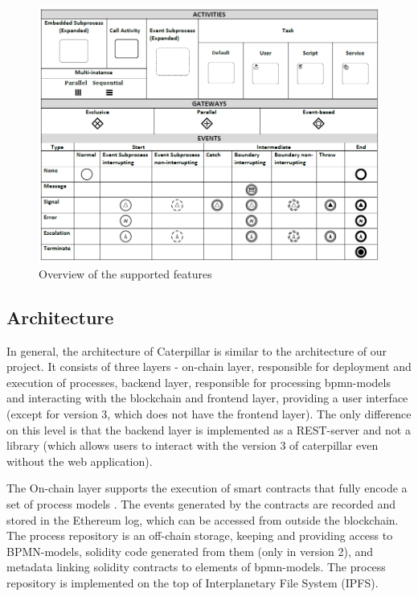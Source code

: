 \begin{figure}[hbt]
	\includegraphics[width=\textwidth]{gfx/caterpillar-bpmn}
	\caption{Overview of the supported features}
	\label{fig:caterpillar:overview:bpmn}
\end{figure}

\subsection{Architecture}
\label{sec:caterpillar:overview:architecture}

In general, the architecture of Caterpillar is similar to the architecture of our project. It consists of three layers - on-chain layer, responsible for deployment and execution of processes, backend layer, responsible for processing bpmn-models and interacting with the blockchain and frontend layer, providing a user interface (except for version 3, which does not have the frontend layer). The only difference on this level is that the backend layer is implemented as a REST-server and not a library (which allows users to interact with the version 3 of caterpillar even without the web application).

The On-chain layer supports the execution of smart contracts that fully encode a set of process models \cite{caterpillar}. The events generated by the contracts are recorded and stored in the Ethereum log, which can be accessed from outside the blockchain. The process repository is an off-chain storage, keeping and providing access to BPMN-models, solidity code generated from them (only in version 2), and metadata linking solidity contracts to elements of bpmn-models. The process repository is implemented on the top of Interplanetary File System (IPFS).

